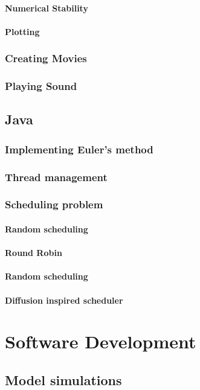 \documentclass[12pt,a4paper]{report}
\begin{document}
	\subsubsection{Numerical Stability}	
	\subsubsection{Plotting}
	\subsection{Creating Movies}
	\subsection{Playing Sound}	
	\section{Java}
	\subsection{Implementing Euler's method}
	\subsection{Thread management}
	\subsection{Scheduling problem}	
	\subsubsection{Random scheduling}
	\subsubsection{Round Robin}
	\subsubsection{Random scheduling}
	\subsubsection{Diffusion inspired scheduler}


\chapter{Software Development}

\section{Model simulations}
\end{document}

